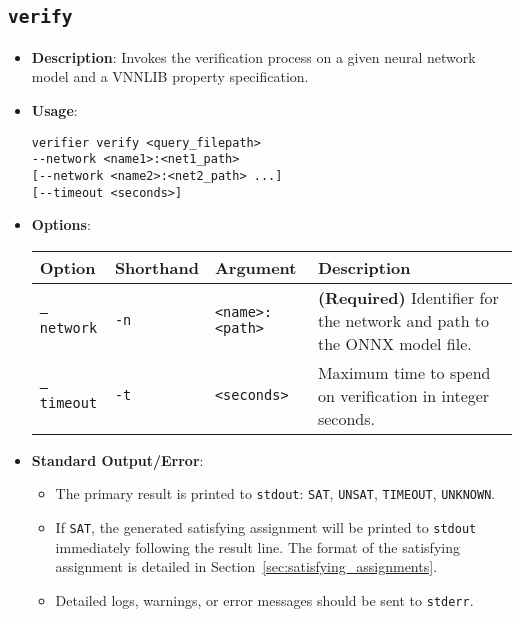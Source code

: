 \subsection{\texttt{verify}}
\label{sec:verify_command}
\begin{itemize}
    \item \textbf{Description}: Invokes the verification process on a given neural network model and a VNNLIB property specification.

    \item \textbf{Usage}:
    \begin{lstlisting}[style=bash]
verifier verify <query_filepath> 
--network <name1>:<net1_path> 
[--network <name2>:<net2_path> ...] 
[--timeout <seconds>]
    \end{lstlisting}

    \item \textbf{Options}:
    \begin{longtable}{@{}>{\raggedright\arraybackslash\ttfamily}p{}   %
                    >{\raggedright\arraybackslash\ttfamily}p{}        %
                    >{\raggedright\arraybackslash\ttfamily}p{}        %
                    >{\raggedright\arraybackslash}p{}@{}}              %
        \toprule
        Option & Shorthand & Argument & Description \\
        \midrule
        \bottomrule
        \texttt{--network} & \texttt{-n} & \texttt{<name>:<path>} & \textbf{(Required)} Identifier for the network and path to the ONNX model file. \\
        \texttt{--timeout} & \texttt{-t} & \texttt{<seconds>} & Maximum time to spend on verification in integer seconds. \\
    \end{longtable}
    
    \item \textbf{Standard Output/Error}:
    \begin{itemize}
        \item The primary result is printed to \texttt{stdout}: \texttt{SAT}, \texttt{UNSAT}, \texttt{TIMEOUT}, \texttt{UNKNOWN}.
        \item If \texttt{SAT}, the generated satisfying assignment will be printed to \texttt{stdout} immediately following the result line. 
        The format of the satisfying assignment is detailed in Section~\ref{sec:satisfying_assignments}.
        \item Detailed logs, warnings, or error messages should be sent to \texttt{stderr}.
    \end{itemize}
\end{itemize}

